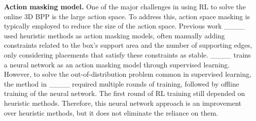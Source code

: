 \textbf{Action masking model.}
One of the major challenges in using RL to solve the online 3D BPP is the large action space. To address this, action space masking is typically employed to reduce the size of the action space. Previous work ____ used heuristic methods as action masking models, often manually adding constraints related to the box's support area and the number of supporting edges, only considering placements that satisfy these constraints as stable. ____ trains a neural network as an action masking model through supervised learning. However, to solve the out-of-distribution problem common in supervised learning, the method in ____ required multiple rounds of training, followed by offline training of the neural network. The first round of RL training still depended on heuristic methods. Therefore, this neural network approach is an improvement over heuristic methods, but it does not eliminate the reliance on them.